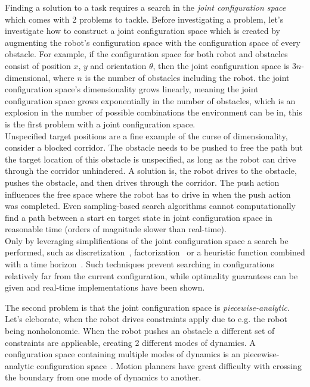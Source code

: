 Finding a solution to a task requires a search in the \textit{joint configuration space} which comes with 2 problems to tackle. Before investigating a problem, let's investigate how to construct a joint configuration space which is created by augmenting the robot's configuration space with the configuration space of every obstacle. For example, if the configuration space for both robot and obstacles consist of position $x$, $y$ and orientation $\theta$, then the joint configuration space is $3n$-dimensional, where $n$ is the number of obstacles including the robot. the joint configuration space's dimensionality grows linearly, meaning the joint configuration space grows exponentially in the number of obstacles, which is an explosion in the number of possible combinations the environment can be in, this is the first problem with a joint configuration space.\\Unspecified target positions are a fine example of the curse of dimensionality, consider a blocked corridor. The obstacle needs to be pushed to free the path but the target location of this obstacle is unspecified, as long as the robot can drive through the corridor unhindered. A solution is, the robot drives to the obstacle, pushes the obstacle, and then drives through the corridor. The push action influences the free space where the robot has to drive in when the push action was completed. Even sampling-based search algorithms cannot computationally find a path between a start en target state in joint configuration space in reasonable time (orders of magnitude slower than real-time).\\Only by leveraging simplifications of the joint configuration space a search be performed, such as discretization~\cite{sabbaghnovin_optimal_2016}, factorization~\cite{vega-brown_asymptotically_2020} or a heuristic function combined with a time horizon~\cite{sabbaghnovin_optimal_2016}. Such techniques prevent searching in configurations relatively far from the current configuration, while optimality guarantees can be given and real-time implementations have been shown.\bs

The second problem is that the joint configuration space is \textit{piecewise-analytic}. Let's eleborate, when the robot drives constraints apply due to e.g. the robot being nonholonomic. When the robot pushes an obstacle a different set of constraints are applicable, creating 2 different modes of dynamics. A configuration space containing multiple modes of dynamics is an piecewise-analytic configuration space~\cite{vega-brown_asymptotically_2020}. Motion planners have great difficulty with crossing the boundary from one mode of dynamics to another.




